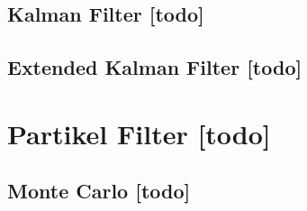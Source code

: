 \subsection{Kalman Filter [todo]}


\begin{comment}
------------------------------------------------------------------------------------------
- \cite{kurth2003experimental}
	- Recent extensions of Kalman Filtering allow for non-Gaussian, multimodal probability distributions through multiple hypothesis tracking. The result is a more versatile estimation technique that still preserves many of the computational advantages of the Kalman filter.
\end{comment}
\subsection{Extended Kalman Filter [todo]}



\begin{comment}
------------------------------------------------------------------------------------------
\end{comment}
\section{Partikel Filter [todo]}

\begin{comment}
------------------------------------------------------------------------------------------
- \cite{kurth2003experimental}
	- Monte Carlo localization, or particle filtering, provides a method of representing multimodal distri-butions for position estimation [4, 12], with the ad-vantage that the computational requirements can be scaled. The main advantage of these methods is their ability to recover robustly from a poor initial condition.
- \cite{fox1999monte}
\end{comment}
\subsection{Monte Carlo [todo]}


\begin{comment}
------------------------------------------------------------------------------------------
Rao-Blackwellized Particle Filtering
https://people.eecs.berkeley.edu/~pabbeel/cs287-fa12/slides/RBPF.pdf

- \cite{murphy2001rao}
	- Rao-Blackwellised particle filtering for dynamic Bayesian networks
\end{comment}
